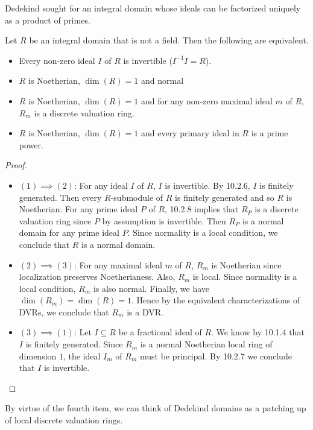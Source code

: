 \documentclass[a4paper]{article}
\begin{document}
Dedekind sought for an integral domain whose ideals can be factorized uniquely as a product of primes. 

\begin{prp}{}{} Let $R$ be an integral domain that is not a field. Then the following are equivalent. 
\begin{itemize}
\item Every non-zero ideal $I$ of $R$ is invertible ($I^{-1}I=R$). 
\item $R$ is Noetherian, $\dim(R)=1$ and normal
\item $R$ is Noetherian, $\dim(R)=1$ and for any non-zero maximal ideal $m$ of $R$, $R_m$ is a discrete valuation ring. 
\item $R$ is Noetherian, $\dim(R)=1$ and every primary ideal in $R$ is a prime power. 
\end{itemize} 
\begin{proof}\\
\begin{itemize}
\item $(1)\implies(2)$: For any ideal $I$ of $R$, $I$ is invertible. By 10.2.6, $I$ is finitely generated. Then every $R$-submodule of $R$ is finitely generated and so $R$ is Noetherian. For any prime ideal $P$ of $R$, 10.2.8 implies that $R_P$ is a discrete valuation ring since $P$ by assumption is invertible. Then $R_P$ is a normal domain for any prime ideal $P$. Since normality is a local condition, we conclude that $R$ is a normal domain. 

\item $(2)\implies(3)$: For any maximal ideal $m$ of $R$, $R_m$ is Noetherian since localization preserves Noetherianess. Also, $R_m$ is local. Since normality is a local condition, $R_m$ is also normal. Finally, we have $\dim(R_m)=\dim(R)=1$. Hence by the equivalent characterizations of DVRs, we conclude that $R_m$ is a DVR. 

\item $(3)\implies(1)$: Let $I\subseteq R$ be a fractional ideal of $R$. We know by 10.1.4 that $I$ is finitely generated. Since $R_m$ is a normal Noetherian local ring of dimension $1$, the ideal $I_m$ of $R_m$ must be principal. By 10.2.7 we conclude that $I$ is invertible. \\

\end{itemize}
\end{proof}
\end{prp}

By virtue of the fourth item, we can think of Dedekind domains as a patching up of local discrete valuation rings. \\
\end{document}
